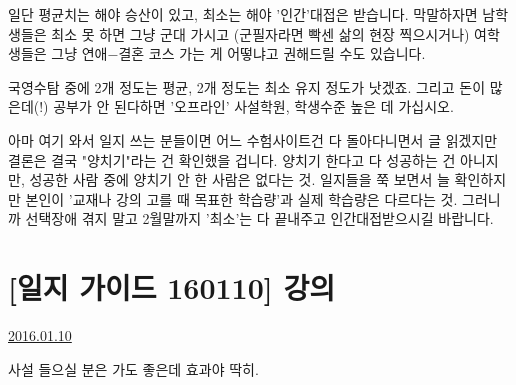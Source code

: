 일단 평균치는 해야 승산이 있고, 최소는 해야 '인간'대접은 받습니다.
막말하자면 남학생들은 최소 못 하면 그냥 군대 가시고 (군필자라면 빡센 삶의 현장 찍으시거나)
여학생들은 그냥 연애$-$결혼 코스 가는 게 어떻냐고 권해드릴 수도 있습니다.
\vspace{5mm}

국영수탐 중에 2개 정도는 평균, 2개 정도는 최소 유지 정도가 낫겠죠.
그리고 돈이 많은데(!) 공부가 안 된다하면 '오프라인' 사설학원, 학생수준 높은 데 가십시오.
\vspace{5mm}

아마 여기 와서 일지 쓰는 분들이면 어느 수험사이트건 다 돌아다니면서 글 읽겠지만
결론은 결국 "양치기"라는 건 확인했을 겁니다. 양치기 한다고 다 성공하는 건 아니지만, 성공한 사람 중에 양치기 안 한 사람은 없다는 것.
일지들을 쭉 보면서 늘 확인하지만 본인이 '교재나 강의 고를 때 목표한 학습량'과 실제 학습량은 다르다는 것.
그러니까 선택장애 겪지 말고 2월말까지 '최소'는 다 끝내주고 인간대접받으시길 바랍니다.
\vspace{5mm}






\section{[일지 가이드 160110] 강의}
\href{https://www.kockoc.com/Apoc/582726}{2016.01.10}

\vspace{5mm}

사설 들으실 분은 가도 좋은데 효과야 딱히.
\vspace{5mm}

